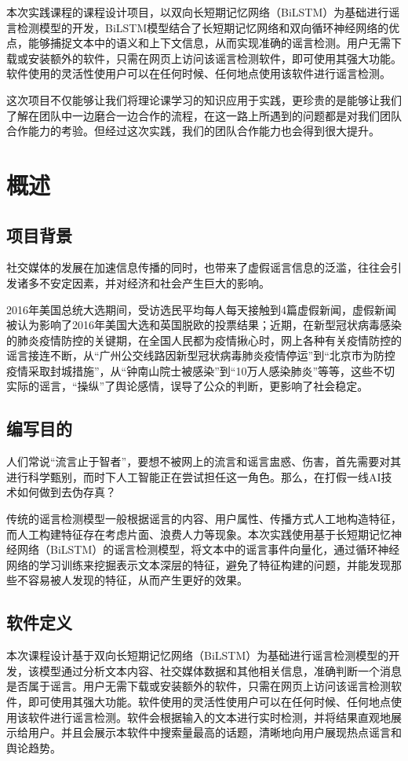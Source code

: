 \documentclass{article}
\begin{document}
本次实践课程的课程设计项目，以双向长短期记忆网络（BiLSTM）为基础进行谣言检测模型的开发，BiLSTM模型结合了长短期记忆网络和双向循环神经网络的优点，能够捕捉文本中的语义和上下文信息，从而实现准确的谣言检测。用户无需下载或安装额外的软件，只需在网页上访问该谣言检测软件，即可使用其强大功能。软件使用的灵活性使用户可以在任何时候、任何地点使用该软件进行谣言检测。

这次项目不仅能够让我们将理论课学习的知识应用于实践，更珍贵的是能够让我们了解在团队中一边磨合一边合作的流程，在这一路上所遇到的问题都是对我们团队合作能力的考验。但经过这次实践，我们的团队合作能力也会得到很大提升。

\newpage

\section{概述}
\subsection{项目背景}
社交媒体的发展在加速信息传播的同时，也带来了虚假谣言信息的泛滥，往往会引发诸多不安定因素，并对经济和社会产生巨大的影响。

2016年美国总统大选期间，受访选民平均每人每天接触到4篇虚假新闻，虚假新闻被认为影响了2016年美国大选和英国脱欧的投票结果；近期，在新型冠状病毒感染的肺炎疫情防控的关键期，在全国人民都为疫情揪心时，网上各种有关疫情防控的谣言接连不断，从“广州公交线路因新型冠状病毒肺炎疫情停运”到“北京市为防控疫情采取封城措施”，从“钟南山院士被感染”到“10万人感染肺炎”等等，这些不切实际的谣言，“操纵”了舆论感情，误导了公众的判断，更影响了社会稳定。

\subsection{编写目的}
人们常说“流言止于智者”，要想不被网上的流言和谣言盅惑、伤害，首先需要对其进行科学甄别，而时下人工智能正在尝试担任这一角色。那么，在打假一线AI技术如何做到去伪存真？

传统的谣言检测模型一般根据谣言的内容、用户属性、传播方式人工地构造特征，而人工构建特征存在考虑片面、浪费人力等现象。本次实践使用基于长短期记忆神经网络（BiLSTM）的谣言检测模型，将文本中的谣言事件向量化，通过循环神经网络的学习训练来挖掘表示文本深层的特征，避免了特征构建的问题，并能发现那些不容易被人发现的特征，从而产生更好的效果。

\subsection{软件定义}
本次课程设计基于双向长短期记忆网络（BiLSTM）为基础进行谣言检测模型的开发，该模型通过分析文本内容、社交媒体数据和其他相关信息，准确判断一个消息是否属于谣言。用户无需下载或安装额外的软件，只需在网页上访问该谣言检测软件，即可使用其强大功能。软件使用的灵活性使用户可以在任何时候、任何地点使用该软件进行谣言检测。软件会根据输入的文本进行实时检测，并将结果直观地展示给用户。并且会展示本软件中搜索量最高的话题，清晰地向用户展现热点谣言和舆论趋势。
\end{document}
